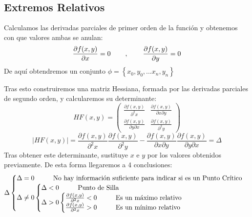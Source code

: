 \subsection{Extremos Relativos}
 Calculamos las derivadas parciales de primer orden de la función y obtenemos con que valores ambas se anulan:
\[
        \frac{\partial f(x,y)}{\partial x} = 0 \hspace{0.75cm},\hspace{0.75cm} \frac{\partial f(x,y)}{\partial y} = 0
\]
 De aquí obtendremos un conjunto \(\phi = \left \{ \left.  x_0, y_0, ... x_n, y_n\right \} \right.\)\par  Tras esto construiremos una matriz Hessiana, formada por las derivadas parciales de segundo orden, y calcularemos su determinante:
\[\boxed{HF(x,y) = \begin{pmatrix}
                        \frac{\partial f(x,y)}{\partial^2 x}           & \frac{\partial f(x,y)}{\partial x \partial y} \\
                        \frac{\partial f(x,y)}{ \partial y \partial x} & \frac{\partial f(x,y)}{\partial^2 y}
                \end{pmatrix}}
\]
\[
        |HF(x,y)| =  \frac{\partial f(x,y)}{\partial^2 x} \frac{\partial f(x,y)}{\partial^2 y} - \frac{\partial f(x,y)}{\partial x \partial y}\frac{\partial f(x,y)}{ \partial y \partial x} = \Delta
\]
 Tras obtener este determinante, sustituye \(x\) e \(y\) por los valores obtenidos previamente. De esta forma llegaremos a 4 conclusiones:
\[
        \Delta
        \begin{cases}
                \Delta = 0 \text{\hspace{1cm}No hay información suficiente para indicar si es un Punto Crítico}
                \\
                \Delta \neq 0
                \begin{cases}
                        \Delta < 0  \text{\hspace{1cm}Punto de Silla}
                        \\
                        \Delta > 0
                        \begin{cases}
                                \frac{\partial f(x,y)}{\partial^2 x} < 0  \text{\hspace{1cm}Es un máximo relativo}
                                \\
                                \frac{\partial f(x,y)}{\partial^2 x} > 0  \text{\hspace{1cm}Es un mínimo relativo}
                        \end{cases}
                \end{cases}
        \end{cases}
\]